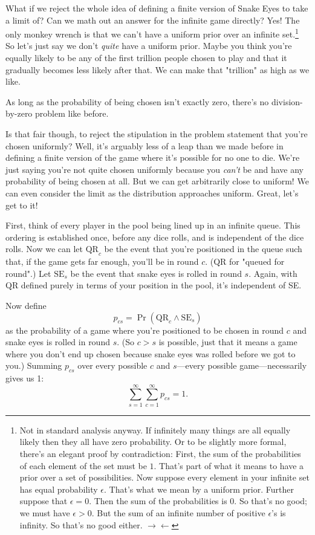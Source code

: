 \documentclass[article,twocolumn]{memoir}
\begin{document}
What if we reject the whole idea of defining a finite version of Snake Eyes to take a limit of?
Can we math out an answer for the infinite game directly?
Yes!
The only monkey wrench is that we can't have a uniform prior over an infinite set.\footnote{
Not in standard analysis anyway.
If infinitely many things are all equally likely then they all have zero probability.
Or to be slightly more formal, there's an elegant proof by contradiction:
First, the sum of the probabilities of each element of the set must be $1$.
That's part of what it means to have a prior over a set of possibilities.
Now suppose every element in your infinite set has equal probability $\epsilon$.
That's what we mean by a uniform prior.
Further suppose that $\epsilon=0$.
Then the sum of the probabilities is $0$.
So that's no good; we must have $\epsilon>0$.
But the sum of an infinite number of positive $\epsilon$'s is infinity.
So that's no good either.
$\rightarrow\leftarrow$
}
So let's just say we don't \emph{quite} have a uniform prior.
Maybe you think you're equally likely to be any of the first trillion people chosen to play and that it gradually becomes less likely after that.
We can make that "trillion" as high as we like.

As long as the probability of being chosen isn't exactly zero, there's no division-by-zero problem like before.

Is that fair though, to reject the stipulation in the problem statement that you're chosen uniformly?
Well, it's arguably less of a leap than we made before in defining a finite version of the game where it's possible for no one to die.
We're just saying you're not quite chosen uniformly because you \emph{can't} be and have any probability of being chosen at all.
But we can get arbitrarily close to uniform!
We can even consider the limit as the distribution approaches uniform.
Great, let's get to it!

First, think of every player in the pool being lined up in an infinite queue.
This ordering is established once, before any dice rolls, and is independent of the dice rolls.
Now we can let 
$\text{QR}_c$ be the event that you're positioned in the queue such that, if the game gets far enough, you'll be in round $c$.
(QR for "queued for round".)
Let $\text{SE}_s$ be the event that snake eyes is rolled in round $s$.
Again, with QR defined purely in terms of your position in the pool, it's independent of SE.

Now define 
$$p_{cs} = \Pr(\text{QR}_c\land \text{SE}_s)$$
as the probability of a game where you're positioned to be chosen in round $c$ and snake eyes is rolled in round $s$.
(So $c>s$ is possible, just that it means a game where you don't end up chosen because snake eyes was rolled before we got to you.)
Summing $p_{cs}$ over every possible $c$ and $s$---every possible game---necessarily gives us 1:
$$
\sum_{s=1}^\infty \sum_{c=1}^\infty p_{cs} = 1.
$$
\end{document}
